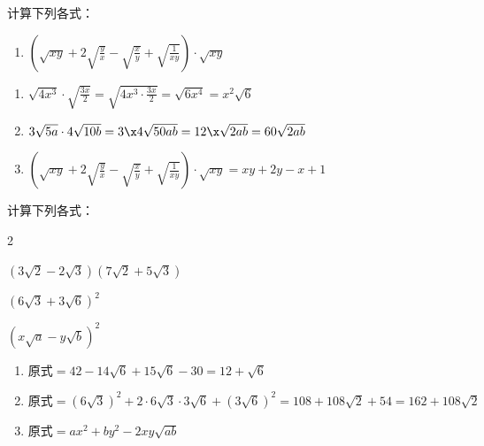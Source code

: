 \begin{example}
    计算下列各式：
\begin{enumerate}
\item $\left(\sqrt{xy}+2\sqrt{\frac{y}{x}}-\sqrt{\frac{x}{y}}+\sqrt{\frac{1}{xy}}\right)\cdot \sqrt{xy}$
\end{enumerate}
\end{example}

\begin{solution}
    \begin{enumerate}
    \item $\sqrt{4x^3}\cdot \sqrt{\frac{3x}{2}}=\sqrt{4x^3\cdot \frac{3x}{2}}=\sqrt{6x^4}=x^2\sqrt{6}$
    \item $3\sqrt{5a}\cdot 4\sqrt{10b}=3\x 4\sqrt{50ab}=12\x \sqrt{2ab}=60\sqrt{2ab}$
    \item $\left(\sqrt{xy}+2\sqrt{\frac{y}{x}}-\sqrt{\frac{x}{y}}+\sqrt{\frac{1}{xy}}\right)\cdot \sqrt{xy}=xy+2y-x+1$
    \end{enumerate}
\end{solution}


\begin{example}
    计算下列各式：
\begin{enumerate}
    \begin{multicols}{2}
    \item $\left(3\sqrt{2}-2\sqrt{3}\right)\left(7\sqrt{2}+5\sqrt{3}\right)$
    \item $\left(6\sqrt{3}+3\sqrt{6}\right)^2$
    \item $\left(x\sqrt{a}-y\sqrt{b}\right)^2$
    \end{multicols}
\end{enumerate}
\end{example}

\begin{solution}
    \begin{enumerate}
    \item $\text{原式}=42-14\sqrt{6}+15\sqrt{6}-30=12+\sqrt{6}$
    \item $\text{原式}=\left(6\sqrt{3}\right)^2+2\cdot 6\sqrt{3}\cdot 3\sqrt{6}+\left(3\sqrt{6}\right)^2=108+108\sqrt{2}+54=162+108\sqrt{2}$
    \item $\text{原式}=ax^2+by^2-2xy\sqrt{ab}$
\end{enumerate}
\end{solution}



